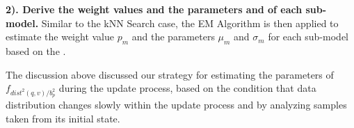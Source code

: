 \noindent\textbf{2). Derive the weight values  and the parameters  and  of each sub-model.}
Similar to the kNN Search case, the EM Algorithm is then applied to estimate the weight value $p_m$ and the parameters $\mu_m$ and $\sigma_m$ for each sub-model based on the .

The discussion above discussed our strategy for estimating the parameters of $f_{dist^2(q,v)/b^2_p}$ during the update process, based on the condition that data distribution changes slowly within the update process and by analyzing samples taken from its initial state. 








